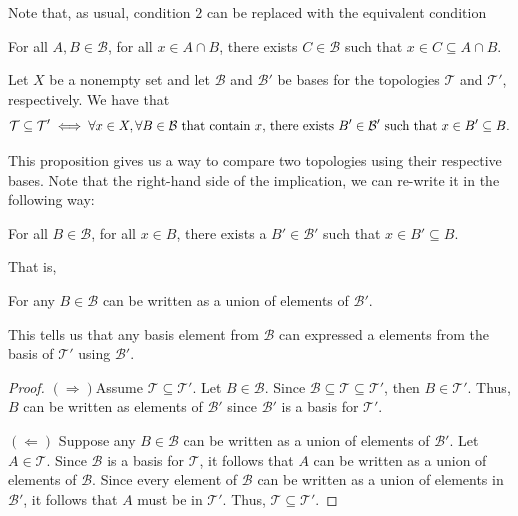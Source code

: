 \begin{remark}
    Note that, as usual, condition \( 2  \) can be replaced with the equivalent condition 
    \begin{center}
        For all \( A,B \in \mathcal{B} \), for all \( x \in A \cap B  \), there exists \( C \in \mathcal{B} \) such that \( x \in C \subseteq A \cap B  \).
    \end{center}
\end{remark}

\begin{prop}
   Let \( X  \) be a nonempty set and let \( \mathcal{B} \) and \( \mathcal{B}' \) be bases for the topologies \( \mathcal{T} \) and \( \mathcal{T}' \), respectively. We have that  
   \[  \mathcal{T} \subseteq  \mathcal{T}' \iff \forall  x \in X, \forall B \in \mathcal{B} \ \text{that contain \( x \), there exists \( B' \in \mathcal{B}' \) such that \( x \in B' \subseteq B \)}. \]
\end{prop}

This proposition gives us a way to compare two topologies using their respective bases. Note that the right-hand side of the implication, we can re-write it in the following way:
\begin{center}
    For all \( B \in \mathcal{B} \), for all \( x \in B \), there exists a \( B' \in \mathcal{B}' \) such that \( x \in B' \subseteq B \).
\end{center}
That is,
\begin{center}
    For any \( B \in \mathcal{B} \) can be written as a union of elements of \( \mathcal{B}' \).
\end{center}
This tells us that any basis element from \( \mathcal{B} \) can expressed a elements from the basis of \( \mathcal{T}' \) using \( \mathcal{B}' \).

\begin{proof}
    \( (\Longrightarrow) \)Assume \( \mathcal{T} \subseteq \mathcal{T}' \). Let \( B \in \mathcal{B} \). Since \( \mathcal{B} \subseteq \mathcal{T} \subseteq  \mathcal{T}' \), then \( B \in \mathcal{T}' \). Thus, \( B \) can be written as elements of \( \mathcal{B}' \) since \( \mathcal{B}' \) is a basis for \( \mathcal{T}' \).

    \( (\Longleftarrow) \) Suppose any \( B \in \mathcal{B} \) can be written as a union of elements of \( \mathcal{B}' \). Let \( A \in \mathcal{T} \). Since \( \mathcal{B} \) is a basis for \( \mathcal{T} \), it follows that \( A  \) can be written as a union of elements of \( \mathcal{B} \). Since every element of \( \mathcal{B} \) can be written as a union of elements in \( \mathcal{B}' \), it follows that \( A  \) must be in \( \mathcal{T}' \). Thus, \( \mathcal{T} \subseteq \mathcal{T}' \).
\end{proof}

